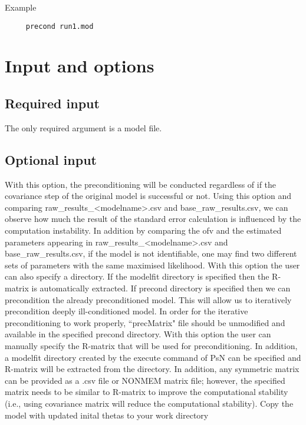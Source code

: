 Example 

\begin{verbatim}
     precond run1.mod
\end{verbatim}

\section{Input and options}

\subsection{Required input}
The only required argument is a model file.

\subsection{Optional input}

\begin{optionlist}
With this option, the preconditioning will be conducted regardless of if the covariance step of the original model is successful or not.  Using this option and comparing raw\_results\_<modelname>.csv and base\_raw\_results.csv, we can observe how much the result of the standard error calculation is influenced by the computation instability.  In addition by comparing the ofv and the estimated parameters appearing in raw\_results\_<modelname>.csv and base\_raw\_results.csv, if the model is not identifiable, one may find two different sets of parameters with the same maximised likelihood.
\nextopt
{}
With this option the user can also specify a directory.  If the modelfit directory is specified then the R-matrix is automatically extracted.  If precond directory is specified then we can precondition the already preconditioned model.  This will allow us to iteratively precondition deeply ill-conditioned model.  In order for the iterative preconditioning to work properly, ``precMatrix" file should be unmodified and available in the specified precond directory.
\nextopt
{}
With this option the user can manually specify the R-matrix that will be used for preconditioning.  In addition, a modelfit directory created by the execute command of PsN can be specified and R-matrix will be extracted from the directory.  In addition, any symmetric matrix can be provided as a .csv file or NONMEM matrix file; however, the specified matrix needs to be similar to R-matrix to improve the computational stability (i.e., using covariance matrix will reduce the computational stability).
\nextopt
{}
Copy the model with updated inital thetas to your work directory	
\nextopt
\end{optionlist}

